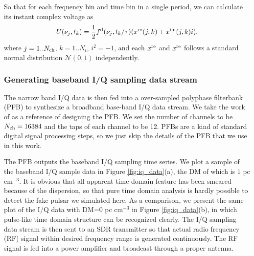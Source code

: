 \documentclass[fleqn,usenatbib]{mnras}
\begin{document}
So that for each frequency bin and time bin in a single period, we can calculate its instant complex voltage as
\begin{gather}
    U(\nu_{j}, t_{k})=\frac{1}{2}f^{\rm d}(\nu_j, t_{k}/\tau)(x^{\rm re}(j,k)+x^{\rm im}(j,k)i),
\end{gather}
where $j=1..N_{\rm ch}$, $k=1..N_{t}$, $i^2=-1$, and each $x^{\rm re}$ and $x^{\rm re}$ follows a standard normal distribution $\mathcal{N}(0,1)$ independently.

\subsubsection{Generating baseband I/Q sampling data stream}

The narrow band I/Q data is then fed into a over-sampled polyphase filterbank (PFB) to synthesize a broadband base-band I/Q data stream.
We take the work of \citet{2020JAI.....950004M} as a reference of designing the PFB.
We set the number of channels to be $N_{\rm ch}=16384$ and the taps of each channel to be 12.
PFBs are a kind of standard digital signal processing steps, so we just skip the details of the PFB that we use in this work.

The PFB outputs the baseband I/Q sampling time series.
We plot a sample of the baseband I/Q sample data in Figure \ref{fig:iq_data}(a), the DM of which is $1$ pc cm$^{-3}$.
It is obvious that all apparent time domain feature has been smeared because of the dispersion, so that pure time domain analysis is hardly possible to detect the fake pulsar we simulated here.
As a comparison, we present the same plot of the I/Q data with DM=0 pc cm$^{-3}$ in Figure \ref{fig:iq_data}(b), in which pulse-like time domain structure can be recognized clearly.
The I/Q sampling data stream is then sent to an SDR transmitter so that actual radio frequency (RF) signal within desired frequency range is generated continuously.
The RF signal is fed into a power amplifier and broadcast through a proper antenna. 
\end{document}
